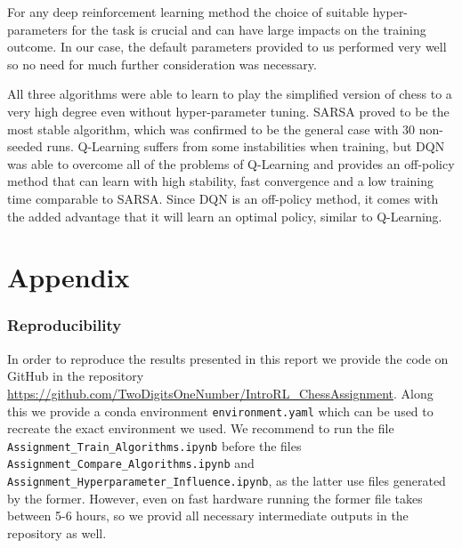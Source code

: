 \documentclass[conference]{IEEEtran}
\begin{document}
For any deep reinforcement learning method the choice of suitable hyper-parameters for the task is crucial and can have large impacts on the training outcome. In our case, the default parameters provided to us performed very well so no need for much further consideration was necessary.

All three algorithms were able to learn to play the simplified version of chess to a very high degree even without hyper-parameter tuning. SARSA proved to be the most stable algorithm, which was confirmed to be the general case with 30 non-seeded runs. Q-Learning suffers from some instabilities when training, but DQN was able to overcome all of the problems of Q-Learning and provides an off-policy method that can learn with high stability, fast convergence and a low training time comparable to SARSA. Since DQN is an off-policy method, it comes with the added advantage that it will learn an optimal policy, similar to Q-Learning.











\section{Appendix}


\subsubsection{Reproducibility}\label{sec:reproducibility}

In order to reproduce the results presented in this report we provide the code on GitHub in the repository \href{https://github.com/TwoDigitsOneNumber/IntroRL\_ChessAssignment}{https://github.com/TwoDigitsOneNumber/IntroRL\_ChessAssignment}. Along this we provide a conda environment \verb"environment.yaml" which can be used to recreate the exact environment we used. We recommend to run the file \verb"Assignment_Train_Algorithms.ipynb" before the files \verb"Assignment_Compare_Algorithms.ipynb" and \verb"Assignment_Hyperparameter_Influence.ipynb", as the latter use files generated by the former. However, even on fast hardware running the former file takes between 5-6 hours, so we provid all necessary intermediate outputs in the repository as well.
\end{document}
